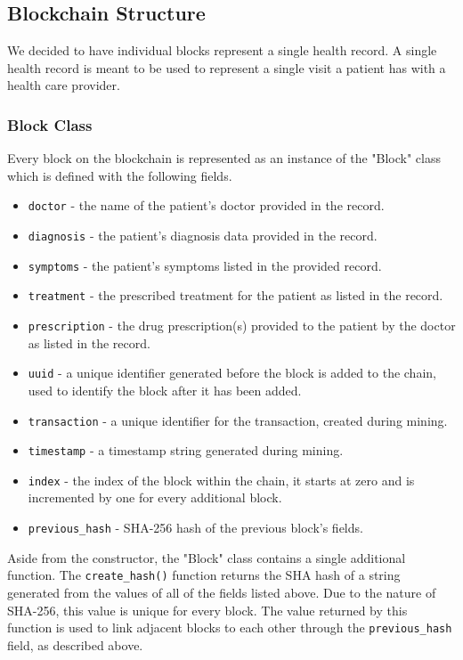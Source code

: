 \documentclass{article}
\begin{document}
\subsection{Blockchain Structure}
We decided to have individual blocks represent a single health record. A single health record is meant to be used to represent a single visit a patient has with a health care provider. 

\subsubsection{Block Class}
Every block on the blockchain is represented as an instance of the "Block" class which is defined with the following fields.
\begin{itemize}
  \item \texttt{doctor} - the name of the patient's doctor provided in the record.
  \item \texttt{diagnosis} - the patient's diagnosis data provided in the record.
  \item \texttt{symptoms} - the patient's symptoms listed in the provided record.
  \item \texttt{treatment} - the prescribed treatment for the patient as listed in the record.
  \item \texttt{prescription} - the drug prescription(s) provided to the patient by the doctor as listed in the record.
  \item \texttt{uuid} - a unique identifier generated before the block is added to the chain, used to identify the block after it has been added.
  \item \texttt{transaction} - a unique identifier for the transaction, created during mining.
  \item \texttt{timestamp} - a timestamp string generated during mining.
  \item \texttt{index} - the index of the block within the chain, it starts at zero and is incremented by one for every additional block.
  \item \texttt{previous\_hash} - SHA-256 hash of the previous block's fields.
\end{itemize}

Aside from the constructor, the "Block" class contains a single additional function. The \texttt{create\_hash()} function returns the SHA hash of a string generated from the values of all of the fields listed above. Due to the nature of SHA-256, this value is unique for every block. The value returned by this function is used to link adjacent blocks to each other through the \texttt{previous\_hash} field, as described above.
\end{document}
